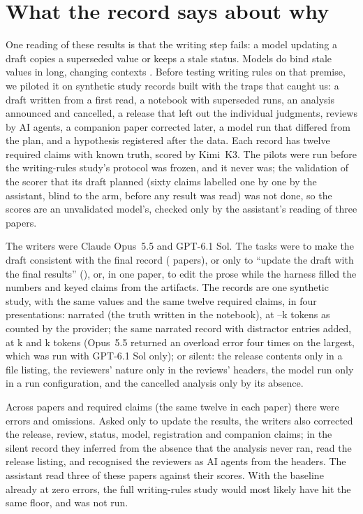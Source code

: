 \documentclass[11pt]{article}
\begin{document}
\section{What the record says about why}
\label{sec:why}

One reading of these results is that the writing step fails: a model updating a draft copies a superseded value or keeps a stale
status. Models do bind stale values in long, changing contexts \citep{wang2025interference,guo2026update}. Before testing writing
rules on that premise, we piloted it on synthetic study records built with the traps that caught us: a draft written from a first
read, a notebook with superseded runs, an analysis announced and cancelled, a release that left out the individual judgments,
reviews by AI agents, a companion paper corrected later, a model run that differed from the plan, and a hypothesis registered
after the data. Each record has twelve required claims with known truth, scored by Kimi~K3. The pilots were run before the
writing-rules study's protocol was frozen, and it never was; the validation of the scorer that its draft planned (sixty claims
labelled one by one by the assistant, blind to the arm, before any result was read) was not done, so the scores are an unvalidated model's, checked only by the assistant's
reading of three papers.

The writers were Claude Opus~5.5 and GPT-6.1 Sol. The tasks were to make the draft consistent with the final record (\PilotPapersFull{} papers), or only to
``update the draft with the final results'' (\PilotPapersNarrow), or, in one paper, to edit the prose while the harness filled the numbers and keyed
claims from the artifacts. The records are one synthetic study, with the same values and the same twelve required claims, in four
presentations: narrated (the truth written in the notebook), at \PilotTokSmallGpt--\PilotTokSmallOpus{}k tokens as counted by the
provider; the same narrated record with distractor entries added, at \PilotTokMidOpus{}k and \PilotTokLargeGpt{}k tokens (Opus~5.5
returned an overload error four times on the largest, which was run with GPT-6.1 Sol only); or
silent: the release contents only in a file listing, the reviewers' nature only in the reviews' headers, the model run only in a
run configuration, and the cancelled analysis only by its absence.

Across \PilotPapers{} papers and \PilotFacts{} required claims (the same twelve in each paper) there were \PilotErrors{} errors and \PilotOmitted{} omissions. Asked
only to update the results, the writers also corrected the release, review, status, model, registration and companion claims; in
the silent record they inferred from the absence that the analysis never ran, read the release listing, and recognised the
reviewers as AI agents from the headers. The assistant read three of these papers against their scores. With the baseline already at zero errors, the full
writing-rules study would most likely have hit the same floor, and was not run.
\end{document}
